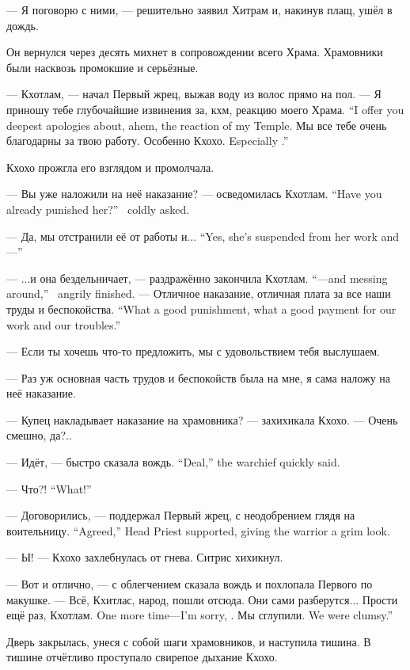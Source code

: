 --- Я поговорю с ними, --- решительно заявил Хитрам и, накинув плащ, ушёл в дождь.

Он вернулся через десять михнет в сопровождении всего Храма.
Храмовники были насквозь промокшие и серьёзные.

--- Кхотлам, --- начал Первый жрец, выжав воду из волос прямо на пол.
{--- Я приношу тебе глубочайшие извинения за, кхм, реакцию моего Храма.}
{``I offer you deepest apologies about, ahem, the reaction of my Temple.}
Мы все тебе очень благодарны за твою работу.
{Особенно Кхохо.}
{Especially \Kchoho.''}

Кхохо прожгла его взглядом и промолчала.

{--- Вы уже наложили на неё наказание? --- осведомилась Кхотлам.}
{``Have you already punished her?'' \Kchotlam\ coldly asked.}

{--- Да, мы отстранили её от работы и...}
{``Yes, she's suspended from her work and---''}

{--- ...и она бездельничает, --- раздражённо закончила Кхотлам.}
{``---and messing around,'' \Kchotlam\ angrily finished.}
{--- Отличное наказание, отличная плата за все наши труды и беспокойства.}
{``What a good punishment, what a good payment for our work and our troubles.''}

--- Если ты хочешь что-то предложить, мы с удовольствием тебя выслушаем.

--- Раз уж основная часть трудов и беспокойств была на мне, я сама наложу на неё наказание.

--- Купец накладывает наказание на храмовника? --- захихикала Кхохо.
--- Очень смешно, да?..

{--- Идёт, --- быстро сказала вождь.}
{``Deal,'' the warchief quickly said.}

{--- Что?!}
{``What!''}

{--- Договорились, --- поддержал Первый жрец, с неодобрением глядя на воительницу.}
{``Agreed,'' Head Priest supported, giving the warrior a grim look.}

--- Ы! --- Кхохо захлебнулась от гнева.
Ситрис хихикнул.

--- Вот и отлично, --- с облегчением сказала вождь и похлопала Первого по макушке.
--- Всё, Кхитлас, народ, пошли отсюда.
Они сами разберутся...
{Прости ещё раз, Кхотлам.}
{One more time---I'm sorry, \Kchotlam.}
{Мы сглупили.}
{We were clumsy.''}

Дверь закрылась, унеся с собой шаги храмовников, и наступила тишина.
В тишине отчётливо проступало свирепое дыхание Кхохо.


